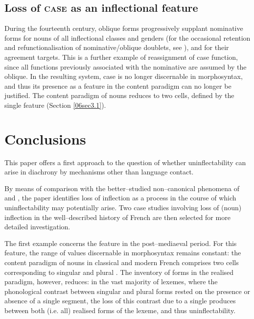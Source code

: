 \documentclass[output=paper,colorlinks,citecolor=brown]{langscibook}
\begin{document}
\subsection{Loss of \textsc{case} as an inflectional feature}

During the fourteenth century, oblique forms progressively supplant nominative forms for nouns of all inflectional classes and genders (for the occasional retention and refunctionalisation of nominative/oblique doublets, see \citealt{smith2011}), and for their agreement targets. This is a further example of reassignment of case function, since all functions previously associated with the nominative are assumed by the oblique. In the resulting system, case is no longer discernable in morphosyntax, and thus its presence as a feature in the content paradigm can no longer be justified. The content paradigm of nouns reduces to two cells, defined by the single feature \textsc{} (Section \ref{06sec3.1}).

\section{Conclusions} \label{06sec5}

This paper offers a first approach to the question of whether uninflectability can arise in diachrony by mechanisms other than language contact.

By means of comparison with the better--studied non--canonical phenomena of  and , the paper identifies loss of inflection as a process in the course of which uninflectability may potentially arise. Two case studies involving loss of (noun) inflection in the well--described history of French are then selected for more detailed investigation.

The first example concerns the feature \textsc{} in the post--mediaeval period. For this feature, the range of values discernable in morphosyntax remains constant: the content paradigm of nouns in classical and modern French comprises two cells corresponding to singular and plural . The inventory of forms in the realised paradigm, however, reduces: in the vast majority of lexemes, where the phonological contrast between singular and plural forms rested on the presence or absence of a single segment, the loss of this contrast due to a single  produces  between both (i.e. all) realised forms of the lexeme, and thus uninflectability.
\end{document}
